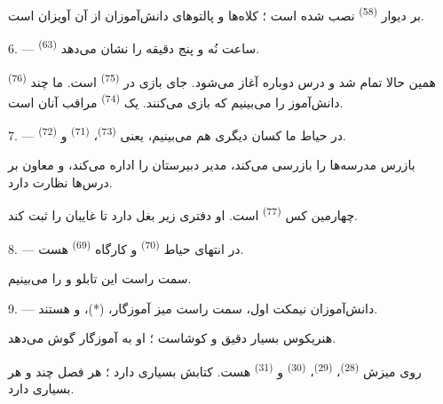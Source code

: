 بر دیوار  \textsuperscript{(58)} نصب شده است ؛ کلاه‌ها و
پالتوهای دانش‌آموزان از آن آویزان است.

\VUsaut{5.2mm}
\VUsaut{3.6mm}

6. ---  \textsuperscript{(63)} ساعت نُه و پنج دقیقه
را نشان می‌دهد.

 \textsuperscript{(76)} همین حالا تمام شد و درس دوباره
آغاز می‌شود. جای بازی در  \textsuperscript{(75)} است. ما
چند دانش‌آموز را می‌بینیم که بازی می‌کنند. یک 
\textsuperscript{(74)} مراقب آنان است.

7. --- در حیاط ما کسان دیگری هم می‌بینیم، یعنی 
\textsuperscript{(73)}،  \textsuperscript{(71)} و
 \textsuperscript{(72)}.

بازرس مدرسه‌ها را بازرسی می‌کند، مدیر دبیرستان را اداره می‌کند، و
معاون بر درس‌ها نظارت دارد.

چهارمین کس  \textsuperscript{(77)} است. او دفتری زیر بغل
دارد تا غایبان را ثبت کند.

8. --- در انتهای حیاط  \textsuperscript{(70)} و
کارگاه  \textsuperscript{(69)} هست.

سمت راست این تابلو   و  را
می‌بینیم.


\VUsaut{2.4mm}

\VUsaut{3.0mm}

9. --- دانش‌آموزان نیمکت اول، سمت راست میز آموزگار، 
(*)،  و  هستند.

هنریکوس بسیار دقیق و کوشاست ؛ او به آموزگار گوش می‌دهد.

روی میزش  \textsuperscript{(28)}، 
\textsuperscript{(29)}،  \textsuperscript{(30)} و
 \textsuperscript{(31)} هست. کتابش 
بسیاری دارد ؛ هر فصل چند  و هر  
بسیاری دارد.

